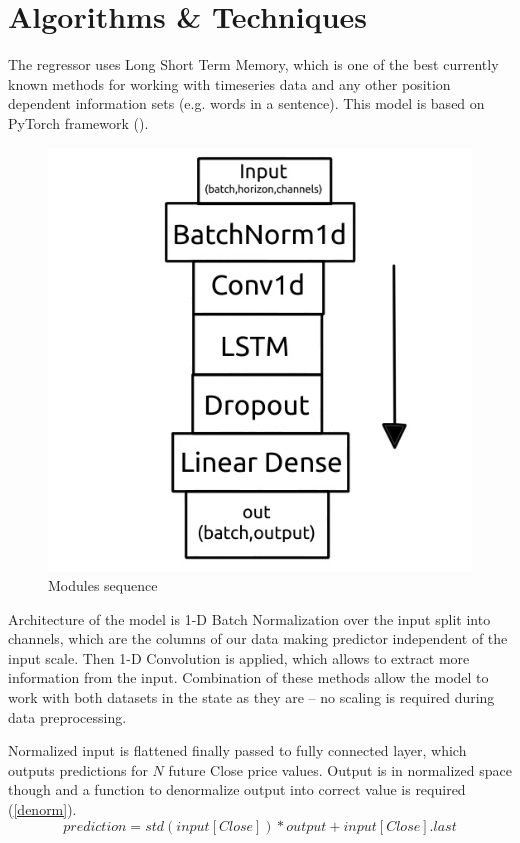 \documentclass[a4paper,12pt]{article}
\begin{document}
\section{Algorithms \& Techniques}
The regressor uses Long Short Term Memory, which is one of the best currently known methods for working with timeseries data and any other position dependent information sets (e.g. words in a sentence). This model is based on PyTorch framework (\cite{Torch}).

\begin{figure}[h]
	\centering
	\includegraphics[scale=1.4]{arch}
	\caption{Modules sequence}
\end{figure}
Architecture of the model is 1-D Batch Normalization over the input split into channels, which are the columns of our data making predictor independent of the input scale. Then 1-D Convolution is applied, which allows to extract more information from the input. Combination of these methods allow the model to work with both datasets in the state as they are -- no scaling is required during data preprocessing.

Normalized input is flattened finally passed to fully connected layer, which outputs predictions for $N$ future Close price values. Output is in normalized space though and a function to denormalize output into correct value is required (\ref{denorm}).
\begin{equation}
\label{denorm}
prediction = std(input[Close]) * output + input[Close].last
\end{equation}
\end{document}
